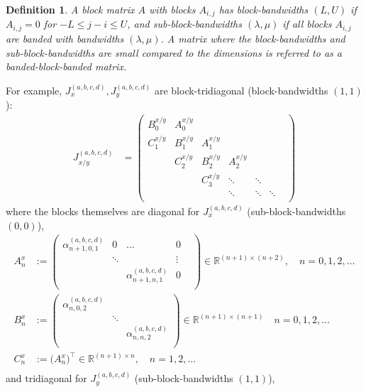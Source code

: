 \documentclass[11pt, oneside]{article}   	%
\newcommand{\R}{\mathbb{R}}
\newcommand{\alphaabcd}{\alpha^{(a,b,c,d)}}
\newtheorem{definition}{Definition}
\begin{document}
\begin{definition}
A block matrix $A$ with blocks $A_{i,j}$ has block-bandwidths $(L,U)$ if $A_{i,j} = 0$ for $- L \leq j-i \leq U$, and sub-block-bandwidths $(\lambda, \mu)$ if all blocks $A_{i,j}$ are banded with bandwidths $(\lambda,\mu)$. A matrix where the block-bandwidths and sub-block-bandwidths are small compared to the dimensions is referred to as a banded-block-banded matrix. 
\end{definition}

For example, $J_x^{(a,b,c,d)}, J_y^{(a,b,c,d)}$ are block-tridiagonal (block-bandwidths $(1,1)$):
\begin{align*}
J_{x/y}^{(a,b,c,d)} &= \begin{pmatrix}
		B^{x/y}_0 & A^{x/y}_0 & & & & \\
		C^{x/y}_1 & B^{x/y}_1 & A^{x/y}_1 & & & \\
		& C^{x/y}_2 & B^{x/y}_2 & A^{x/y}_2  & & & \\
		& & C^{x/y}_3 & \ddots & \ddots & \\
		& & & \ddots & \ddots & \ddots \\
	\end{pmatrix}
\end{align*}
where the blocks themselves are diagonal for $J_x^{(a,b,c,d)}$ (sub-block-bandwidths $(0,0)$),
\begin{align*}
A^x_n &:= \begin{pmatrix}
		\alphaabcd_{n+1,0,1} & 0 & \hdots & 0 \\
		& \ddots & & \vdots & \\
		& & \alphaabcd_{n+1,n,1} & 0 \\
	    \end{pmatrix} \in \R^{(n+1)\times(n+2)}, \quad n = 0,1,2,\dots \\
B^x_n &:= \begin{pmatrix}
		\alphaabcd_{n,0,2} & & \\
		& \ddots & \\
		& & \alphaabcd_{n,n,2} \\
	    \end{pmatrix} \in \R^{(n+1)\times(n+1)} \quad n = 0,1,2,\dots \\
C^x_n &:= \big( A^x_n \big)^\top \in \R^{(n+1)\times n},  \quad n = 1,2,\dots \\ 
\nonumber
\end{align*}
and tridiagonal for $J_y^{(a,b,c,d)}$ (sub-block-bandwidths $(1,1)$),
\end{document}
